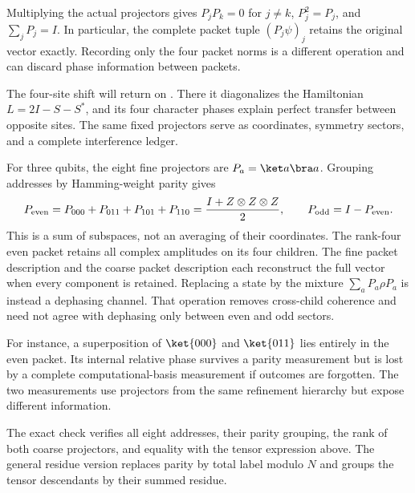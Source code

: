 Multiplying the actual projectors gives $P_jP_k=0$ for $j\ne k$, $P_j^2=P_j$, and $\sum_jP_j=I$. In particular, the complete packet tuple $(P_j\psi)_j$ retains the original vector exactly. Recording only the four packet norms is a different operation and can discard phase information between packets.

The four-site shift will return on . There it diagonalizes the Hamiltonian $L=2I-S-S^*$, and its four character phases explain perfect transfer between opposite sites. The same fixed projectors serve as coordinates, symmetry sectors, and a complete interference ledger.

For three qubits, the eight fine projectors are $P_a=\ket a\bra a$. Grouping addresses by Hamming-weight parity gives
\[
P_{\rm even}=P_{000}+P_{011}+P_{101}+P_{110}
=\frac{I+Z\otimes Z\otimes Z}{2},
\qquad P_{\rm odd}=I-P_{\rm even}.
\]
This is a sum of subspaces, not an averaging of their coordinates. The rank-four even packet retains all complex amplitudes on its four children.
The fine packet description and the coarse packet description each reconstruct the full vector when every component is retained. Replacing a state by the mixture $\sum_aP_a\rho P_a$ is instead a dephasing channel. That operation removes cross-child coherence and need not agree with dephasing only between even and odd sectors.

For instance, a superposition of $\ket{000}$ and $\ket{011}$ lies entirely in the even packet. Its internal relative phase survives a parity measurement but is lost by a complete computational-basis measurement if outcomes are forgotten. The two measurements use projectors from the same refinement hierarchy but expose different information.

The exact check verifies all eight addresses, their parity grouping, the rank of both coarse projectors, and equality with the tensor expression above. The general residue version replaces parity by total label modulo $N$ and groups the tensor descendants by their summed residue.

